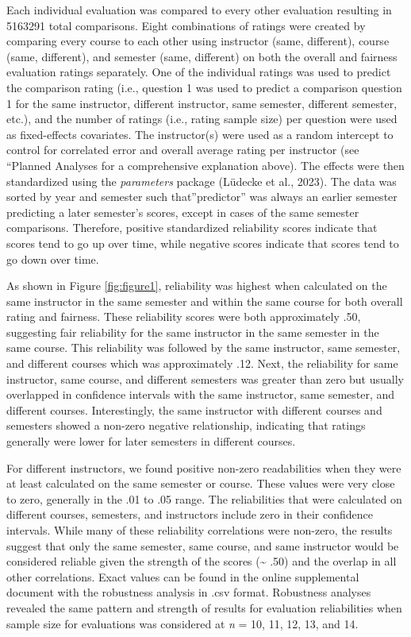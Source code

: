 \documentclass[
  man]{apa7}
\begin{document}
Each individual evaluation was compared to every other evaluation
resulting in 5163291 total comparisons. Eight combinations of
ratings were created by comparing every course to each other using
instructor (same, different), course (same, different), and semester
(same, different) on both the overall and fairness evaluation ratings
separately. One of the individual ratings was used to predict the
comparison rating (i.e., question 1 was used to predict a comparison
question 1 for the same instructor, different instructor, same semester,
different semester, etc.), and the number of ratings (i.e., rating
sample size) per question were used as fixed-effects covariates. The
instructor(s) were used as a random intercept to control for correlated
error and overall average rating per instructor (see ``Planned Analyses for a comprehensive explanation above). The effects were then standardized using
the \emph{parameters} package (Lüdecke et al., 2023). The data was sorted by year and
semester such that''predictor'' was always an earlier semester predicting
a later semester's scores, except in cases of the same semester
comparisons. Therefore, positive standardized reliability scores
indicate that scores tend to go up over time, while negative scores
indicate that scores tend to go down over time.

As shown in Figure \ref{fig:figure1}, reliability was highest when
calculated on the same instructor in the same semester and within the
same course for both overall rating and fairness. These reliability
scores were both approximately .50, suggesting fair reliability for the
same instructor in the same semester in the same course. This
reliability was followed by the same instructor, same semester, and
different courses which was approximately .12. Next, the reliability for
same instructor, same course, and different semesters was greater than
zero but usually overlapped in confidence intervals with the same
instructor, same semester, and different courses. Interestingly, the
same instructor with different courses and semesters showed a non-zero
negative relationship, indicating that ratings generally were lower for
later semesters in different courses.

For different instructors, we found positive non-zero readabilities when
they were at least calculated on the same semester or course. These
values were very close to zero, generally in the .01 to .05 range. The
reliabilities that were calculated on different courses, semesters, and
instructors include zero in their confidence intervals. While many of
these reliability correlations were non-zero, the results suggest that
only the same semester, same course, and same instructor would be
considered reliable given the strength of the scores (\textasciitilde{} .50) and the
overlap in all other correlations. Exact values can be found in the
online supplemental document with the robustness analysis in .csv
format. Robustness analyses revealed the same pattern and strength of
results for evaluation reliabilities when sample size for evaluations
was considered at \emph{n} = 10, 11, 12, 13, and 14.
\end{document}
